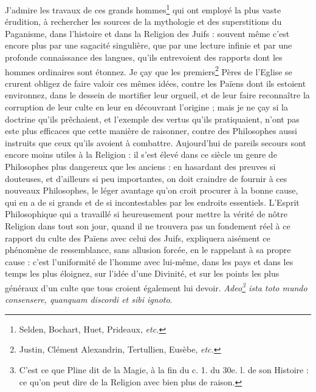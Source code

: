 \documentclass[a4paper, 11pt, oneside, polutonikogreek, french]{article}
\begin{document}
J'admire les travaux de ces grands hommes\footnote{Selden, Bochart, Huet, Prideaux, \emph{etc.}} qui ont employé la plus vaste érudition, à rechercher les sources de la mythologie et des superstitions du Paganisme, dans l'histoire et dans la Religion des Juifs : souvent même c'est encore plus par une sagacité singulière, que par une lecture infinie et par une profonde connaissance des langues, qu'ils entrevoient des rapports dont les hommes ordinaires sont étonnez. Je çay que les premiers\footnote{Justin, Clément Alexandrin, Tertullien, Eusèbe, \emph{etc.}} Pères de l'Eglise se crurent obligez de faire valoir ces mêmes idées, contre les Païens dont ils estoient environnez, dans le dessein de mortifier leur orgueil, et de leur faire reconnaître la corruption de leur culte en leur en découvrant l'origine ; mais je ne çay si la doctrine qu'ils prêchaient, et l'exemple des vertus qu'ils pratiquaient, n'ont pas este plus efficaces que cette manière de raisonner, contre des Philosophes aussi instruits que ceux qu'ils avoient à combattre. Aujourd’hui de pareils secours sont encore moins utiles à la Religion : il s'est élevé dans ce siècle un genre de Philosophes plus dangereux que les anciens : en hasardant des preuves si douteuses, et d'ailleurs si peu importantes, on doit craindre de fournir à ces nouveaux Philosophes, le léger avantage qu'on croit procurer à la bonne cause, qui en a de si grands et de si incontestables par les endroits essentiels. L'Esprit Philosophique qui a travaillé si heureusement pour mettre la vérité de nôtre Religion dans tout son jour, quand il ne trouvera pas un fondement réel à ce rapport du culte des Païens avec celui des Juifs, expliquera aisément ce phénomène de ressemblance, sans allusion forcée, en le rappelant à sa propre cause : c'est l'uniformité de l'homme avec lui-même, dans les pays et dans les temps les plus éloignez, sur l'idée d'une Divinité, et sur les points les plus généraux d'un culte que tous croient également lui devoir. \emph{Adeo\footnote{C'est ce que Pline dit de la Magie, à la fin du c. 1. du 30e. l. de son Histoire : ce qu'on peut dire de la Religion avec bien plus de raison.} ista toto mundo consensere, quanquam discordi et sibi ignoto}.
\end{document}
